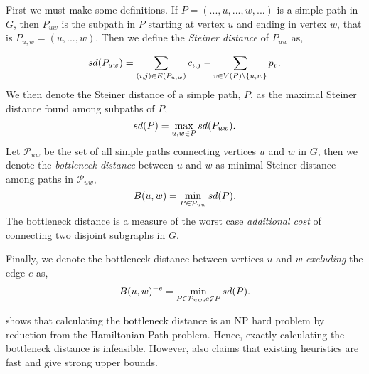 First we must make some definitions.
If $P = (..., u, ..., w, ...)$ is a simple path in $G$, then $P_{uw}$ is
the subpath in $P$ starting at vertex $u$ and ending in vertex $w$,
that is $P_{u,w} = (u, ...,w)$. Then we define the \textit{Steiner distance} of
 $P_{uw}$ as,

 $$sd(P_{uw}) = \sum_{(i,j) \in E(P_{u,w})} c_{i,j} -
 \sum_{v \in V(P) \setminus \{u,w\}} p_{v}\mathnormal{.}$$
 We then denote the Steiner distance of a simple path, $P$, as the maximal Steiner
 distance found among subpaths of $P$,
 $$sd(P) = \max_{u,w \in P} sd(P_{uw})\mathnormal{.}$$
 Let $\mathcal{P}_{uw}$ be the set of all simple paths
 connecting vertices $u$ and $w$ in
 $G$, then we denote the \textit{bottleneck distance} between $u$ and $w$ as minimal Steiner
  distance among paths in $\mathcal{P}_{uw}$,
  $$B(u,w) = \min_{P \in  \mathcal{P}_{uw}} sd(P)\mathnormal{.}$$
  The bottleneck distance is a measure of the worst case \textit{additional cost}
 of connecting
 two disjoint subgraphs in $G$.


  Finally, we denote the bottleneck distance between vertices $u$ and $w$ \textit{excluding}
  the edge $e$ as, 
  $$B(u,w)^{-e} = \min_{P \in  \mathcal{P}_{uw}, e \not \in P} sd(P)\mathnormal{.}$$


 \cite{uchoa2006reduction} shows that calculating the bottleneck distance
 is an NP hard problem by reduction from the Hamiltonian Path problem. Hence,
 exactly calculating the bottleneck distance is infeasible. However, \cite{uchoa2006reduction}
 also claims that existing heuristics are fast and give strong upper bounds.
